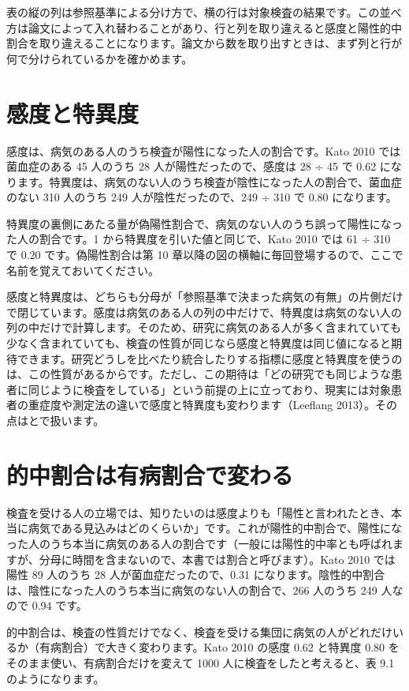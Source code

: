 表の縦の列は参照基準による分け方で、横の行は対象検査の結果です。この並べ方は論文によって入れ替わることがあり、行と列を取り違えると感度と陽性的中割合を取り違えることになります。論文から数を取り出すときは、まず列と行が何で分けられているかを確かめます。

\section{感度と特異度}
\label{sec:09-2}

感度は、病気のある人のうち検査が陽性になった人の割合です。Kato 2010 では菌血症のある 45 人のうち 28 人が陽性だったので、感度は 28 ÷ 45 で 0.62 になります。特異度は、病気のない人のうち検査が陰性になった人の割合で、菌血症のない 310 人のうち 249 人が陰性だったので、249 ÷ 310 で 0.80 になります。

特異度の裏側にあたる量が偽陽性割合で、病気のない人のうち誤って陽性になった人の割合です。1 から特異度を引いた値と同じで、Kato 2010 では 61 ÷ 310 で 0.20 です。偽陽性割合は第 10 章以降の図の横軸に毎回登場するので、ここで名前を覚えておいてください。

感度と特異度は、どちらも分母が「参照基準で決まった病気の有無」の片側だけで閉じています。感度は病気のある人の列の中だけで、特異度は病気のない人の列の中だけで計算します。そのため、研究に病気のある人が多く含まれていても少なく含まれていても、検査の性質が同じなら感度と特異度は同じ値になると期待できます。研究どうしを比べたり統合したりする指標に感度と特異度を使うのは、この性質があるからです。ただし、この期待は「どの研究でも同じような患者に同じように検査をしている」という前提の上に立っており、現実には対象患者の重症度や測定法の違いで感度と特異度も変わります（Leeflang 2013）。その点はとで扱います。

\section{的中割合は有病割合で変わる}
\label{sec:09-3}

検査を受ける人の立場では、知りたいのは感度よりも「陽性と言われたとき、本当に病気である見込みはどのくらいか」です。これが陽性的中割合で、陽性になった人のうち本当に病気のある人の割合です（一般には陽性的中率とも呼ばれますが、分母に時間を含まないので、本書では割合と呼びます）。Kato 2010 では陽性 89 人のうち 28 人が菌血症だったので、0.31 になります。陰性的中割合は、陰性になった人のうち本当に病気のない人の割合で、266 人のうち 249 人なので 0.94 です。

的中割合は、検査の性質だけでなく、検査を受ける集団に病気の人がどれだけいるか（有病割合）で大きく変わります。Kato 2010 の感度 0.62 と特異度 0.80 をそのまま使い、有病割合だけを変えて 1000 人に検査をしたと考えると、表 9.1 のようになります。

